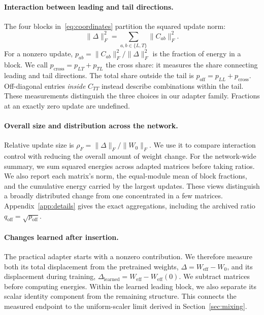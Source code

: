 \documentclass{article}
\newcommand{\off}{\mathrm{off}}
\newcommand{\cross}{\mathrm{cross}}
\begin{document}
\paragraph{Interaction between leading and tail directions.}
The four blocks in~\eqref{eq:coordinates} partition the squared update norm:
\begin{equation}
\|\Delta\|_F^2=\sum_{a,b\in\{L,T\}}\|C_{ab}\|_F^2.
\label{eq:energy}
\end{equation}
For a nonzero update, $p_{ab}=\|C_{ab}\|_F^2/\|\Delta\|_F^2$ is the fraction of energy in a block. We call $p_\cross=p_{LT}+p_{TL}$ the cross share: it measures the share connecting leading and tail directions. The total share outside the tail is $p_\off=p_{LL}+p_\cross$. Off-diagonal entries \emph{inside} $C_{TT}$ instead describe combinations within the tail. These measurements distinguish the three choices in our adapter family. Fractions at an exactly zero update are undefined.

\paragraph{Overall size and distribution across the network.}
Relative update size is $\rho_F=\|\Delta\|_F/\|W_0\|_F$. We use it to compare interaction control with reducing the overall amount of weight change. For the network-wide summary, we sum squared energies across adapted matrices before taking ratios. We also report each matrix's norm, the equal-module mean of block fractions, and the cumulative energy carried by the largest updates. These views distinguish a broadly distributed change from one concentrated in a few matrices. Appendix~\ref{app:details} gives the exact aggregations, including the archived ratio $q_\off=\sqrt{p_\off}$.

\paragraph{Changes learned after insertion.}
The practical adapter starts with a nonzero contribution. We therefore measure both its total displacement from the pretrained weights, $\Delta=W_{\mathrm{eff}}-W_0$, and its displacement during training, $\Delta_{\mathrm{learned}}=W_{\mathrm{eff}}-W_{\mathrm{eff}}(0)$. We subtract matrices before computing energies. Within the learned leading block, we also separate its scalar identity component from the remaining structure. This connects the measured endpoint to the uniform-scaler limit derived in Section~\ref{sec:mixing}.
\end{document}
